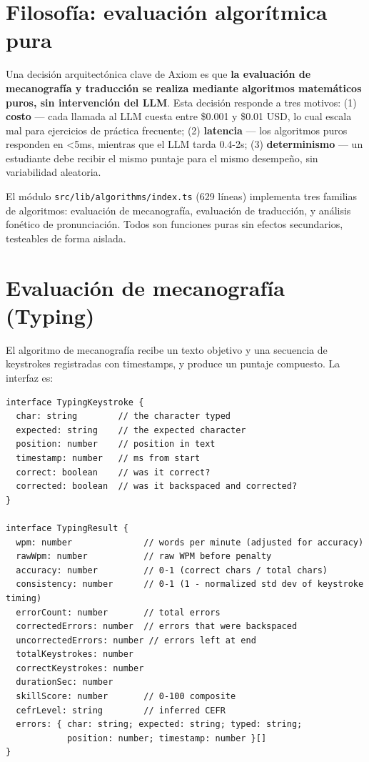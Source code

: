 \documentclass[10pt,a4paper,oneside]{report}
\begin{document}
\section{Filosofía: evaluación algorítmica pura}
Una decisión arquitectónica clave de Axiom es que \textbf{la evaluación de mecanografía y traducción se realiza mediante algoritmos matemáticos puros, sin intervención del LLM}. Esta decisión responde a tres motivos: (1) \textbf{costo} — cada llamada al LLM cuesta entre \$0.001 y \$0.01 USD, lo cual escala mal para ejercicios de práctica frecuente; (2) \textbf{latencia} — los algoritmos puros responden en <5ms, mientras que el LLM tarda 0.4-2s; (3) \textbf{determinismo} — un estudiante debe recibir el mismo puntaje para el mismo desempeño, sin variabilidad aleatoria.

El módulo \texttt{src/lib/algorithms/index.ts} (629 líneas) implementa tres familias de algoritmos: evaluación de mecanografía, evaluación de traducción, y análisis fonético de pronunciación. Todos son funciones puras sin efectos secundarios, testeables de forma aislada.

\section{Evaluación de mecanografía (Typing)}
El algoritmo de mecanografía recibe un texto objetivo y una secuencia de keystrokes registradas con timestamps, y produce un puntaje compuesto. La interfaz es:

\begin{lstlisting}[style=ts,caption={Tipos para evaluación de mecanografía}]
interface TypingKeystroke {
  char: string        // the character typed
  expected: string    // the expected character
  position: number    // position in text
  timestamp: number   // ms from start
  correct: boolean    // was it correct?
  corrected: boolean  // was it backspaced and corrected?
}

interface TypingResult {
  wpm: number              // words per minute (adjusted for accuracy)
  rawWpm: number           // raw WPM before penalty
  accuracy: number         // 0-1 (correct chars / total chars)
  consistency: number      // 0-1 (1 - normalized std dev of keystroke timing)
  errorCount: number       // total errors
  correctedErrors: number  // errors that were backspaced
  uncorrectedErrors: number // errors left at end
  totalKeystrokes: number
  correctKeystrokes: number
  durationSec: number
  skillScore: number       // 0-100 composite
  cefrLevel: string        // inferred CEFR
  errors: { char: string; expected: string; typed: string;
            position: number; timestamp: number }[]
}
\end{lstlisting}
\end{document}
